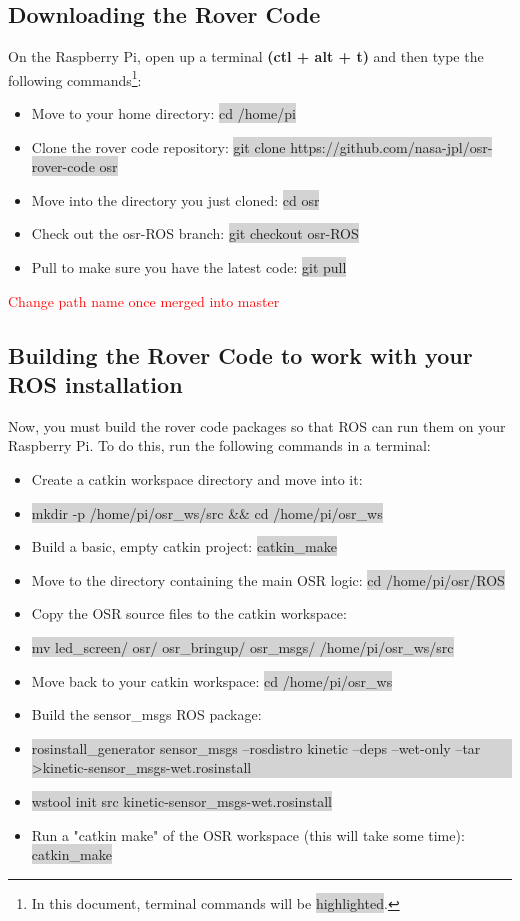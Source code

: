 \documentclass[12pt]{article}
\begin{document}
\subsection{Downloading the Rover Code}
On the Raspberry Pi, open up a terminal \textbf{(ctl + alt + t)} and then type the following commands\footnote{In this document, terminal commands will be \colorbox{lightgray}{highlighted}.}:

\begin{itemize}
	\item[] Move to your home directory: \colorbox{lightgray}{cd /home/pi}
	\item[] Clone the rover code repository: \colorbox{lightgray}{git clone https://github.com/nasa-jpl/osr-rover-code osr}
	\item[] Move into the directory you just cloned: \colorbox{lightgray}{cd osr}
	\item[] Check out the osr-ROS branch: \colorbox{lightgray}{git checkout osr-ROS}
	\item[] Pull to make sure you have the latest code: \colorbox{lightgray}{git pull}
\end{itemize}

\textcolor{red}{Change path name once merged into master}

\subsection{Building the Rover Code to work with your ROS installation}
Now, you must build the rover code packages so that ROS can run them on your Raspberry Pi.  To do this, run the following commands in a terminal:

\begin{itemize}
	\item[] Create a catkin workspace directory and move into it:
	\item[] \colorbox{lightgray}{mkdir -p /home/pi/osr\_ws/src \&\& cd /home/pi/osr\_ws}
	\item[] Build a basic, empty catkin project: \colorbox{lightgray}{catkin\_make}
	\item[] Move to the directory containing the main OSR logic: \colorbox{lightgray}{cd /home/pi/osr/ROS}
	\item[] Copy the OSR source files to the catkin workspace:
	\item[] \colorbox{lightgray}{mv led\_screen/ osr/ osr\_bringup/ osr\_msgs/ /home/pi/osr\_ws/src}
	\item[] Move back to your catkin workspace: \colorbox{lightgray}{cd /home/pi/osr\_ws}
	\item[] Build the sensor\_msgs ROS package:
	\item[] \colorbox{lightgray}{\parbox{0.9\textwidth}{rosinstall\_generator sensor\_msgs --rosdistro kinetic --deps --wet-only --tar \textgreater kinetic-sensor\_msgs-wet.rosinstall}}
	\item[] \colorbox{lightgray}{wstool init src kinetic-sensor\_msgs-wet.rosinstall}
	\item[] Run a "catkin make" of the OSR workspace (this will take some time): \colorbox{lightgray}{catkin\_make}
\end{itemize}
\end{document}
